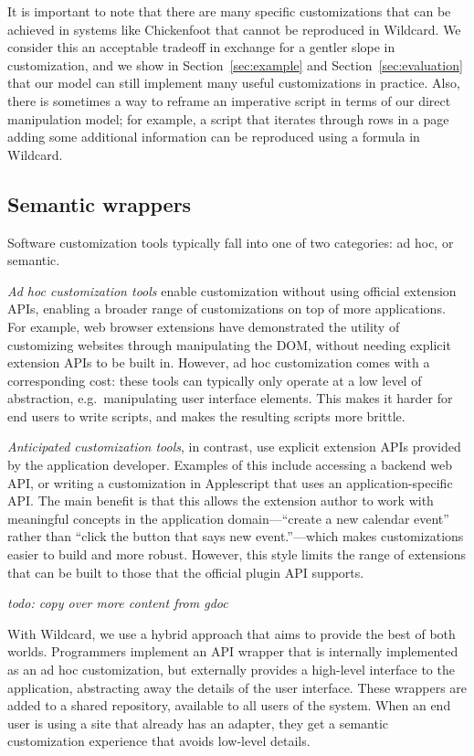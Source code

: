 \documentclass[sigplan,screen,10pt,anonymous,review]{acmart}
\begin{document}
It is important to note that there are many specific customizations that
can be achieved in systems like Chickenfoot \citep{bolin2005} that
cannot be reproduced in Wildcard. We consider this an acceptable
tradeoff in exchange for a gentler slope in customization, and we show
in Section~\ref{sec:example} and Section~\ref{sec:evaluation} that our
model can still implement many useful customizations in practice. Also,
there is sometimes a way to reframe an imperative script in terms of our
direct manipulation model; for example, a script that iterates through
rows in a page adding some additional information can be reproduced
using a formula in Wildcard.

\hypertarget{semantic-wrappers}{%
\subsection{Semantic wrappers}\label{semantic-wrappers}}

Software customization tools typically fall into one of two categories:
ad hoc, or semantic.

\emph{Ad hoc customization tools} enable customization without using
official extension APIs, enabling a broader range of customizations on
top of more applications. For example, web browser extensions have
demonstrated the utility of customizing websites through manipulating
the DOM, without needing explicit extension APIs to be built in.
However, ad hoc customization comes with a corresponding cost: these
tools can typically only operate at a low level of abstraction,
e.g.~manipulating user interface elements. This makes it harder for end
users to write scripts, and makes the resulting scripts more brittle.

\emph{Anticipated customization tools}, in contrast, use explicit
extension APIs provided by the application developer. Examples of this
include accessing a backend web API, or writing a customization in
Applescript that uses an application-specific API. The main benefit is
that this allows the extension author to work with meaningful concepts
in the application domain---``create a new calendar event'' rather than
``click the button that says new event.''---which makes customizations
easier to build and more robust. However, this style limits the range of
extensions that can be built to those that the official plugin API
supports.

\emph{todo: copy over more content from gdoc}

With Wildcard, we use a hybrid approach that aims to provide the best of
both worlds. Programmers implement an API wrapper that is internally
implemented as an ad hoc customization, but externally provides a
high-level interface to the application, abstracting away the details of
the user interface. These wrappers are added to a shared repository,
available to all users of the system. When an end user is using a site
that already has an adapter, they get a semantic customization
experience that avoids low-level details.
\end{document}
